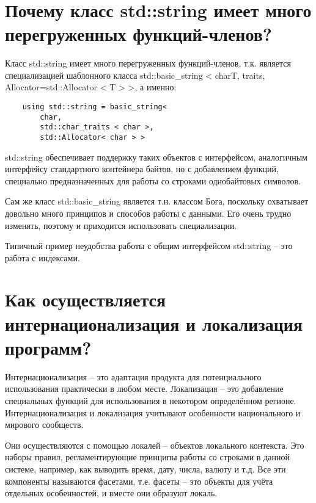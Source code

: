 \documentclass[a4paper,12pt]{article}	%
\title{
	\center{\textbf{Контрольные вопросы. Задание 17.}}
	}
\begin{document}

\maketitle

\section{Почему класс std::string имеет много перегруженных функций-членов?}

	Класс std::string имеет много перегруженных функций-членов, т.к. является специализацией шаблонного класса std::basic\_string < charT, traits, Allocator=std::Allocator < T > >,  а именно:
	
	\begin{lstlisting}
	using std::string = basic_string<
		char,
		std::char_traits < char >, 
		std::Allocator< char > >
	\end{lstlisting}
	
	std::string обеспечивает поддержку таких объектов с интерфейсом, аналогичным интерфейсу стандартного контейнера байтов, но с добавлением функций, специально предназначенных для работы со строками однобайтовых символов.
	
	Сам же класс std::basic\_string является т.н. классом Бога, поскольку охватывает довольно много принципов и способов работы с данными. Его очень трудно изменять, поэтому и приходится использовать специализации.
	
	Типичный пример неудобства работы с общим интерфейсом std::string -- это работа с индексами.
	
\section{Как осуществляется интернационализация и локализация программ?}		
	
	Интернационализация -- это адаптация продукта для потенциального использования практически в любом месте. Локализация -- это добавление специальных функций для использования в некотором определённом регионе. Интернационализация и локализация учитывают особенности национального и мирового сообществ.
	
	Они осуществляются с помощью локалей -- объектов локального контекста. Это наборы правил, регламентирующие принципы работы со строками в данной системе, например, как выводить время, дату, числа, валюту и т.д. Все эти компоненты называются фасетами, т.е. фасеты -- это объекты для учёта отдельных особенностей, и вместе они образуют локаль.
	
\end{document}
